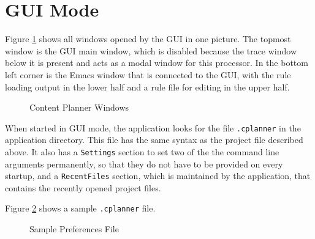 \documentclass[11pt,a4paper]{article}
\begin{document}
\section{GUI Mode}

Figure \ref{fig:allguiwindows} shows all windows opened by the GUI in one
picture. The topmost window is the GUI main window, which is disabled because
the trace window below it is present and acts as a modal window for this
processor. In the bottom left corner is the Emacs window that is connected
to the GUI, with the rule loading output in the lower half and a rule file
for editing in the upper half.

\begin{figure}[htbp]
  \centering
  \caption{Content Planner Windows}
  \label{fig:allguiwindows}
\end{figure}

When started in GUI mode, the application looks for the file \texttt{.cplanner}
in the application directory. This file has the same syntax as the project
file described above. It also has a \texttt{Settings} section to set two of the
the command line arguments permanently, so that they do not have to be provided
on every startup, and a \texttt{RecentFiles} section, which is maintained by
the application, that contains the recently opened project files.

Figure \ref{fig:preferencesfile} shows a sample \texttt{.cplanner} file.

\begin{figure}[htbp]
  \centering
  \centering{}

  \caption{Sample Preferences File}
  \label{fig:preferencesfile}
\end{figure}
\end{document}
